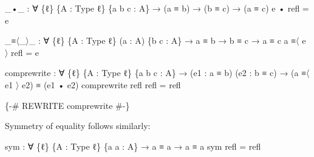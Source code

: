 \documentclass[
  11pt,
  oneside,
  article]{memoir}
\newenvironment{Shaded}{}{}
\newcommand{\NormalTok}[1]{#1}
\newcommand{\OtherTok}[1]{\textcolor[rgb]{0.00,0.44,0.13}{#1}}
\newcommand{\PreprocessorTok}[1]{\textcolor[rgb]{0.74,0.48,0.00}{#1}}
\theoremstyle{definition}
\theoremstyle{plain}
\newcommand{\0}{\textsf{0}}
\newcommand{\1}{\tn{\textsf{1}}}
\begin{document}
\begin{Shaded}
\begin{Highlighting}[]
\OtherTok{\_}\NormalTok{•}\OtherTok{\_} \OtherTok{:} \OtherTok{∀} \OtherTok{\{}\NormalTok{ℓ}\OtherTok{\}} \OtherTok{\{}\NormalTok{A }\OtherTok{:}\NormalTok{ Type ℓ}\OtherTok{\}} \OtherTok{\{}\NormalTok{a b c }\OtherTok{:}\NormalTok{ A}\OtherTok{\}}
      \OtherTok{→} \OtherTok{(}\NormalTok{a ≡ b}\OtherTok{)} \OtherTok{→} \OtherTok{(}\NormalTok{b ≡ c}\OtherTok{)} \OtherTok{→} \OtherTok{(}\NormalTok{a ≡ c}\OtherTok{)}
\NormalTok{e • refl }\OtherTok{=}\NormalTok{ e}
\end{Highlighting}
\end{Shaded}

\begin{Shaded}
\begin{Highlighting}[]
\OtherTok{\_}\NormalTok{≡〈}\OtherTok{\_}\NormalTok{〉}\OtherTok{\_} \OtherTok{:} \OtherTok{∀} \OtherTok{\{}\NormalTok{ℓ}\OtherTok{\}} \OtherTok{\{}\NormalTok{A }\OtherTok{:}\NormalTok{ Type ℓ}\OtherTok{\}} \OtherTok{(}\NormalTok{a }\OtherTok{:}\NormalTok{ A}\OtherTok{)} \OtherTok{\{}\NormalTok{b c }\OtherTok{:}\NormalTok{ A}\OtherTok{\}} 
          \OtherTok{→}\NormalTok{ a ≡ b }\OtherTok{→}\NormalTok{ b ≡ c }\OtherTok{→}\NormalTok{ a ≡ c}
\NormalTok{a ≡〈 e 〉 refl }\OtherTok{=}\NormalTok{ e}

\NormalTok{comprewrite }\OtherTok{:} \OtherTok{∀} \OtherTok{\{}\NormalTok{ℓ}\OtherTok{\}} \OtherTok{\{}\NormalTok{A }\OtherTok{:}\NormalTok{ Type ℓ}\OtherTok{\}} \OtherTok{\{}\NormalTok{a b c }\OtherTok{:}\NormalTok{ A}\OtherTok{\}}
              \OtherTok{→} \OtherTok{(}\NormalTok{e1 }\OtherTok{:}\NormalTok{ a ≡ b}\OtherTok{)} \OtherTok{(}\NormalTok{e2 }\OtherTok{:}\NormalTok{ b ≡ c}\OtherTok{)}
              \OtherTok{→} \OtherTok{(}\NormalTok{a ≡〈 e1 〉 e2}\OtherTok{)}\NormalTok{ ≡ }\OtherTok{(}\NormalTok{e1 • e2}\OtherTok{)}
\NormalTok{comprewrite refl refl }\OtherTok{=}\NormalTok{ refl}

\PreprocessorTok{\{{-}\# REWRITE comprewrite \#{-}\}}
\end{Highlighting}
\end{Shaded}

Symmetry of equality follows similarly:

\begin{Shaded}
\begin{Highlighting}[]
\NormalTok{sym }\OtherTok{:} \OtherTok{∀} \OtherTok{\{}\NormalTok{ℓ}\OtherTok{\}} \OtherTok{\{}\NormalTok{A }\OtherTok{:}\NormalTok{ Type ℓ}\OtherTok{\}} \OtherTok{\{}\NormalTok{a a\textquotesingle{} }\OtherTok{:}\NormalTok{ A}\OtherTok{\}} \OtherTok{→}\NormalTok{ a ≡ a\textquotesingle{} }\OtherTok{→}\NormalTok{ a\textquotesingle{} ≡ a}
\NormalTok{sym refl }\OtherTok{=}\NormalTok{ refl}
\end{Highlighting}
\end{Shaded}
\end{document}

